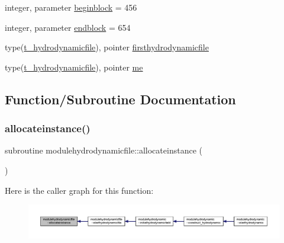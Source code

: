 \begin{DoxyCompactItemize}
integer, parameter \mbox{\hyperlink{namespacemodulehydrodynamicfile_aa9a0102373e2ba53486502369dce4f77}{beginblock}} = 456
\item 
integer, parameter \mbox{\hyperlink{namespacemodulehydrodynamicfile_a09579531077fde3aa1c2e499c84a99de}{endblock}} = 654
\item 
type(\mbox{\hyperlink{structmodulehydrodynamicfile_1_1t__hydrodynamicfile}{t\+\_\+hydrodynamicfile}}), pointer \mbox{\hyperlink{namespacemodulehydrodynamicfile_a19fd9db203a8d9b66d8a7b7bca53f69e}{firsthydrodynamicfile}}
\item 
type(\mbox{\hyperlink{structmodulehydrodynamicfile_1_1t__hydrodynamicfile}{t\+\_\+hydrodynamicfile}}), pointer \mbox{\hyperlink{namespacemodulehydrodynamicfile_a4456fc1410cb6837e54a8073a1e664e0}{me}}
\end{DoxyCompactItemize}


\subsection{Function/\+Subroutine Documentation}
\mbox{\label{namespacemodulehydrodynamicfile_a5235543e6aa405ed126b0ca0fdf38961}} 
\subsubsection{\texorpdfstring{allocateinstance()}{allocateinstance()}}
{\footnotesize\ttfamily subroutine modulehydrodynamicfile\+::allocateinstance (\begin{DoxyParamCaption}{ }\end{DoxyParamCaption})\hspace{0.3cm}{\ttfamily [private]}}

Here is the caller graph for this function\+:\nopagebreak
\begin{figure}[H]
\begin{center}
\leavevmode
\includegraphics[width=350pt]{namespacemodulehydrodynamicfile_a5235543e6aa405ed126b0ca0fdf38961_icgraph}
\end{center}
\end{figure}
\mbox{\label{namespacemodulehydrodynamicfile_ac67e9023c973dadd99ed3b893b1cc9ad}} 
